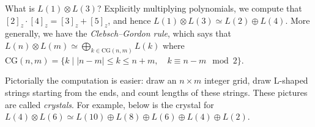 \begin{example}
    What is $L(1)\otimes L(3)$? Explicitly multiplying polynomials, we
    compute that $[2]_z \cdot [4]_z = [3]_z + [5]_z$, and hence $L(1)\otimes
    L(3)\simeq L(2)\oplus L(4)$. More generally, we have the
    \emph{Clebsch--Gordon rule}, which says that $L(n)\otimes L(m)\simeq
    \bigoplus_{k\in \text{CG}(n,m)}L(k)$ where $\text{CG}(n,m)=\{k\;|\; |n-m|\leq k
    \leq n+m, \quad k\equiv n-m \mod 2 \}$.

    Pictorially the computation is easier: draw an $n\times m$ integer grid, draw
    L-shaped strings starting from the ends, and count lengths of these strings.
    These pictures are called \emph{crystals}. For example, below is the crystal
    for $L(4)\otimes L(6)\simeq L(10)\oplus L(8) \oplus L(6) \oplus L(4)\oplus
    L(2)$.


\end{example}
